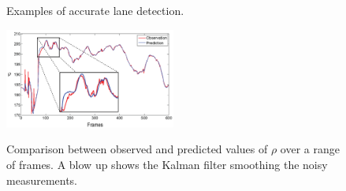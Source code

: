 \documentclass{article}
\begin{document}
\begin{figure}[htb!]
  \centering
  \hspace{0.00001in}
  \\
  \hspace{0.00001in}
  \\
  \caption{Examples of accurate lane detection.}
  \label{fig:lane_detection}
\end{figure}
\begin{figure}[htb!]
  \centering
  \includegraphics[width=0.5\textwidth]{IMG/obs_pred_rho.png}\\
  \caption{Comparison between observed and predicted values of $\rho$ over a range of frames. A blow up shows the Kalman filter smoothing the noisy measurements.}
  \label{fig:obs_pred_kalman}
\end{figure}
\end{document}
